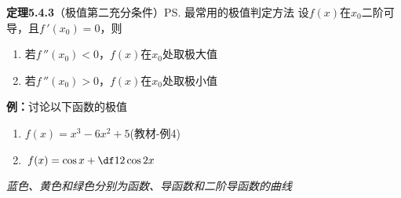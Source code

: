 {\bf 定理5.4.3}（极值第二充分条件）\ps{最常用的极值判定方法}
设$f(x)$在$x_0$二阶可导，且$f\,'(x_0)=0$，则
\begin{enumerate}[(1)]
  \setlength{\itemindent}{1cm}
  \item 若$f\,''(x_0)<0$，$f(x)$在$x_0$处取极大值 
  \item 若$f\,''(x_0)>0$，$f(x)$在$x_0$处取极小值
\end{enumerate}

{\bf 例：}讨论以下函数的极值
\begin{enumerate}[(1)]
  \setlength{\itemindent}{1cm}
  \item $f(x)=x^3-6x^2+5$\hfill (教材-例4)
  \item $f(x)=\cos x+\df12\cos 2x$
\end{enumerate}

\begin{center}
	\quad
	
	{\it 蓝色、黄色和绿色分别为函数、导函数和二阶导函数的曲线}
\end{center}

